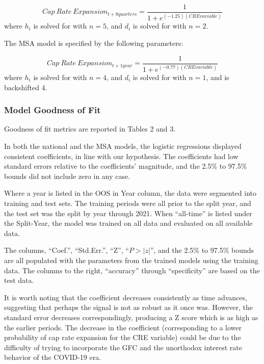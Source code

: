 \documentclass[jrfm,article,accept,oneauthor,pdftex]{Definitions/mdpi}
\begin{document}
\begin{equation}
Cap\:Rate\:Expansion_{t+8quarters} =  \frac{1}{1+e^{(-1.25)(CRE variable)}}
\end{equation}
where $h_i$ is solved for with %
$n=5$, and $d_i$ is solved for with $n=2$.

The MSA model is specified by the following parameters:

\begin{equation}
Cap\:Rate\:Expansion_{t+1year} =  \frac{1}{1+e^{(-0.77)(CRE variable)}}
\end{equation}
where $h_i$ is solved for with $n=4$, and $d_i$ is solved for with $n=1$, and is backshifted 4.

\subsubsection{Model Goodness of Fit}

Goodness of fit metrics are reported in Tables 2 and 3.

In both the national and the MSA models, the logistic regressions displayed consistent coefficients, in line with our hypothesis. The coefficients had low standard errors relative  to the coefficients' magnitude, and the 2.5\% to 97.5\% bounds did not include zero in any case. 

Where a year is listed in the OOS in Year column, the data were segmented into training and test sets. The training periods were all prior to the split year, and the test set was the split by year through 2021. When “all-time” is listed under the Split-Year, the model was trained on all data and evaluated on all available data. 

The columns, ``Coef.'', ``Std.Err.'', ``Z'', ``$P>|z|$'', and the 2.5\% to 97.5\% bounds are all populated with the parameters from the trained models using the training data. The columns to the right, ``accuracy'' through ``specificity'' are based on the test data. 

It is worth noting that the coefficient decreases consistently as time advances, suggesting that perhaps the signal is not as robust as it once was. However, the standard error decreases correspondingly, producing a Z score which is as high as the earlier periods. The decrease in the coefficient (corresponding to a lower probability of cap rate expansion for the CRE variable) could be due to the difficulty of trying to incorporate the GFC and the unorthodox interest rate behavior of the COVID-19 era. 
\end{document}
